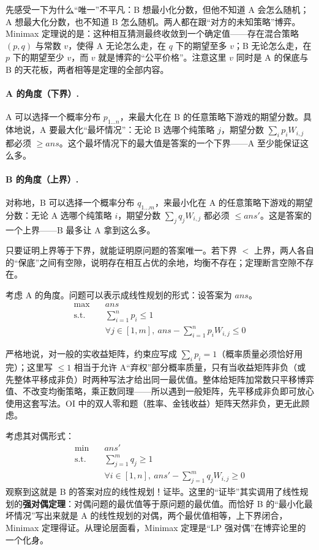 \documentclass[UTF8,a4paper,11pt,oneside,openany,fontset=fandol]{ctexbook}
\theoremstyle{definition}
\begin{document}
先感受一下为什么“唯一”不平凡：B 想最小化分数，但他不知道 A 会怎么随机；A 想最大化分数，也不知道 B 怎么随机。两人都在跟“对方的未知策略”博弈。Minimax 定理说的是：这种相互猜测最终收敛到一个确定值——存在混合策略 $(p,q)$ 与常数 $v$，使得 A 无论怎么走，在 $q$ 下的期望至多 $v$；B 无论怎么走，在 $p$ 下的期望至少 $v$，而 $v$ 就是博弈的“公平价格”。注意这里 $v$ 同时是 A 的保底与 B 的天花板，两者相等是定理的全部内容。

\paragraph{A 的角度（下界）.} A 可以选择一个概率分布 $p_{1\ldots n}$，来最大化在 B 的任意策略下游戏的期望分数。具体地说，A 要最大化“最坏情况”：无论 B 选哪个纯策略 $j$，期望分数 $\sum_i p_iW_{i,j}$ 都必须 $\ge ans$。这个最坏情况下的最大值是答案的一个下界——A 至少能保证这么多。

\paragraph{B 的角度（上界）.} 对称地，B 可以选择一个概率分布 $q_{1\ldots m}$，来最小化在 A 的任意策略下游戏的期望分数：无论 A 选哪个纯策略 $i$，期望分数 $\sum_j q_jW_{i,j}$ 都必须 $\le ans'$。这是答案的一个上界——B 最多让 A 拿到这么多。

只要证明上界等于下界，就能证明原问题的答案唯一。若下界 $<$ 上界，两人各自的“保底”之间有空隙，说明存在相互占优的余地，均衡不存在；定理断言空隙不存在。

考虑 A 的角度。问题可以表示成线性规划的形式：设答案为 $ans$。
\[
 \begin{aligned}
 \max\quad & ans\\
 \text{s.t.}\quad & \sum_{i=1}^{n}p_i\le1\\
 & \forall j\in[1,m],\ ans-\sum_{i=1}^{n}p_iW_{i,j}\le0
 \end{aligned}
\]

\begin{pitfall}[$\sum p_i\le1$ 还是 $\sum p_i=1$]
严格地说，对一般的实收益矩阵，约束应写成 $\sum_i p_i=1$（概率质量必须恰好用完）；这里写 $\le1$ 相当于允许 A“弃权”部分概率质量，只有当收益矩阵非负（或先整体平移成非负）时两种写法才给出同一最优值。整体给矩阵加常数只平移博弈值、不改变均衡策略，乘正数同理——所以遇到一般矩阵，先平移成非负即可放心使用这套写法。OI 中的双人零和题（胜率、金钱收益）矩阵天然非负，更无此顾虑。
\end{pitfall}

考虑其对偶形式：
\[
 \begin{aligned}
 \min\quad & ans'\\
 \text{s.t.}\quad & \sum_{j=1}^{m}q_j\ge1\\
 & \forall i\in[1,n],\ ans'-\sum_{j=1}^{m}q_jW_{i,j}\ge0
 \end{aligned}
\]
观察到这就是 B 的答案对应的线性规划！证毕。这里的“证毕”其实调用了线性规划的\textbf{强对偶定理}：对偶问题的最优值等于原问题的最优值。而恰好 B 的“最小化最坏情况”写出来就是 A 的线性规划的对偶，两个最优值相等，上下界闭合，Minimax 定理得证。从理论层面看，Minimax 定理是“LP 强对偶”在博弈论里的一个化身。
\end{document}
